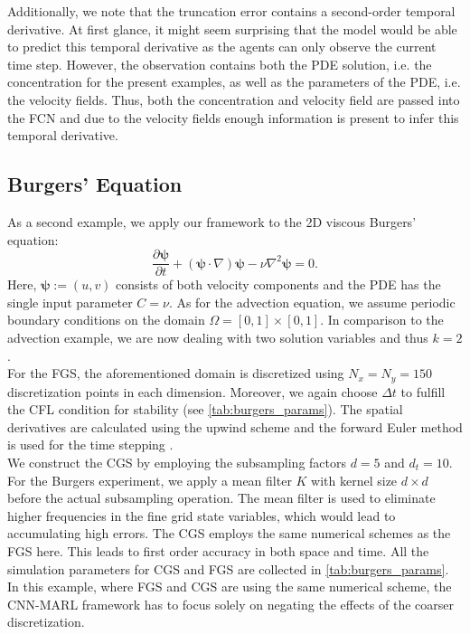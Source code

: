 \documentclass{article}
\theoremstyle{plain}
\theoremstyle{definition}
\theoremstyle{remark}
\begin{document}
 Additionally, we note that the truncation error contains a second-order temporal derivative. At first glance, it might seem surprising that the model would be able to predict this temporal derivative as the agents can only observe the current time step. However, the observation contains both the PDE solution, i.e. the concentration for the present examples, as well as the parameters of the PDE, i.e. the velocity fields. Thus, both the concentration and velocity field are passed into the FCN and due to the velocity fields enough information is present to infer this temporal derivative.

\subsection{Burgers' Equation}
As a second example, we apply our framework to the 2D viscous Burgers' equation:
\begin{equation}
\frac{\partial \boldsymbol{\psi}}{\partial t} + (\boldsymbol{\psi} \cdot \nabla) \boldsymbol{\psi} - \nu \nabla^2 \boldsymbol{\psi} = 0.
\end{equation}
Here, $\boldsymbol{\psi} := (u, v)$ consists of both velocity components and the PDE has the single input parameter $C=\nu$. As for the advection equation, we assume  periodic boundary conditions on the domain \(\Omega = [0, 1] \times [0, 1]\). 
In comparison to the advection example, we are now dealing with two solution variables and thus $k=2$.\\
For the FGS, the aforementioned domain is discretized using $N_x=N_y=150$ discretization points in each dimension. Moreover, we again choose $\Delta t$ to fulfill the CFL condition for stability (see \cref{tab:burgers_params}). The spatial derivatives are calculated using the upwind scheme and the forward Euler method is used for the time stepping \cite{quarteroni2008numerical}.\\
We construct the CGS by employing the subsampling factors $d=5$ and $d_t=10$. For the Burgers experiment, we apply a mean filter $K$ with kernel size $d\times d$ before the actual subsampling operation. The mean filter is used to eliminate higher frequencies in the fine grid state variables, which would lead to accumulating high errors. The CGS employs the same numerical schemes as the FGS here. This leads to first order accuracy in both space and time. All the simulation parameters for CGS and FGS are collected in \cref{tab:burgers_params}. \\
In this example, where FGS and CGS are using the same numerical scheme, the CNN-MARL framework has to focus solely on negating the effects of the coarser discretization. 
\end{document}
